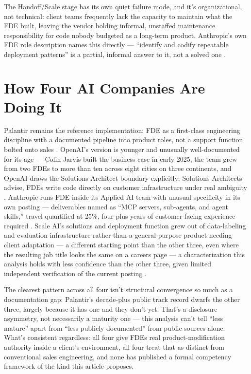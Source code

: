 \documentclass[journal]{IEEEtran}
\begin{document}
The Handoff/Scale stage has its own quiet failure mode, and it's organizational, not technical: client teams frequently lack the capacity to maintain what the FDE built, leaving the vendor holding informal, unstaffed maintenance responsibility for code nobody budgeted as a long-term product. Anthropic's own FDE role description names this directly --- ``identify and codify repeatable deployment patterns'' is a partial, informal answer to it, not a solved one \cite{anthropic2026fde}.

\section{How Four AI Companies Are Doing It}
\label{sec:cases}

Palantir remains the reference implementation: FDE as a first-class engineering discipline with a documented pipeline into product roles, not a support function bolted onto sales \cite{orosz2025fde,palantir2026fdse}. OpenAI's version is younger and unusually well-documented for its age --- Colin Jarvis built the business case in early 2025, the team grew from two FDEs to more than ten across eight cities on three continents, and OpenAI draws the Solutions-Architect boundary explicitly: Solutions Architects advise, FDEs write code directly on customer infrastructure under real ambiguity \cite{orosz2025fde}. Anthropic runs FDE inside its Applied AI team with unusual specificity in its own posting --- deliverables named as ``MCP servers, sub-agents, and agent skills,'' travel quantified at 25\%, four-plus years of customer-facing experience required \cite{anthropic2026fde}. Scale AI's solutions and deployment function grew out of data-labeling and evaluation infrastructure rather than a general-purpose product needing client adaptation --- a different starting point than the other three, even where the resulting job title looks the same on a careers page --- a characterization this analysis holds with less confidence than the other three, given limited independent verification of the current posting \cite{scaleai2026fde}.

The clearest pattern across all four isn't structural convergence so much as a documentation gap: Palantir's decade-plus public track record dwarfs the other three, largely because it has one and they don't yet. That's a disclosure asymmetry, not necessarily a maturity one --- this analysis can't tell ``less mature'' apart from ``less publicly documented'' from public sources alone. What's consistent regardless: all four give FDEs real product-modification authority inside a client's environment, all four treat that as distinct from conventional sales engineering, and none has published a formal competency framework of the kind this article proposes.
\end{document}
